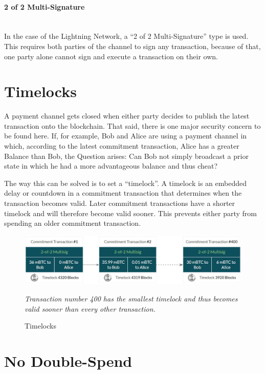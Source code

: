 \documentclass[a4paper, 12pt]{report}
\begin{document}
\paragraph{2 of 2 Multi-Signature} \hspace{0pt} \\
In the case of the Lightning Network, a “2 of 2 Multi-Signature” type is used. This requires both parties of the channel to sign any transaction, because of that, one party alone cannot sign and execute a transaction on their own.

\section{Timelocks}

\par A payment channel gets closed when either party decides to publish the latest transaction onto the blockchain. That said, there is one major security concern to be found here. If, for example, Bob and Alice are using a payment channel in which, according to the latest commitment transaction, Alice has a greater Balance than Bob, the Question arises: Can Bob not simply broadcast a prior state in which he had a more advantageous balance and thus cheat?

\par The way this can be solved is to set a “timelock”. A timelock is an embedded delay or countdown in a commitment transaction that determines when the transaction becomes valid. Later commitment transactions have a shorter timelock and will therefore become valid sooner. This prevents either party from spending an older commitment transaction.

\begin{figure}[h]
	\centering
	\includegraphics[width=13cm]{08_Timelocks}
	\caption{Timelocks}
	\medskip
	\small \textit{Transaction number 400 has the smallest timelock and thus becomes valid sooner than every other transaction.}
	\label{fig:08_Timelocks}
\end{figure}

\section{No Double-Spend}
\end{document}
